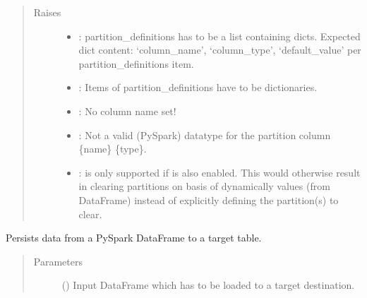 \documentclass[a4paper,10pt, twoside,english]{sphinxmanual}
\begin{document}
\begin{fulllineitems}
\begin{quote}
\begin{description}
\begin{itemize}
\end{itemize}

\item[{Raises}] \leavevmode\begin{itemize}
\item {} 
: \textendash{} partition\_definitions has to be a list containing dicts. Expected dict content:
‘column\_name’, ‘column\_type’, ‘default\_value’ per partition\_definitions item.

\item {} 
: \textendash{} Items of partition\_definitions have to be dictionaries.

\item {} 
: \textendash{} No column name set!

\item {} 
: \textendash{} Not a valid (PySpark) datatype for the partition column \{name\} \textbar{} \{type\}.

\item {} 
: \textendash{}  is only supported if  is also enabled.
This would otherwise result in clearing partitions on basis of dynamically values
(from DataFrame) instead of explicitly defining the partition(s) to clear.

\end{itemize}

\end{description}\end{quote}

\begin{fulllineitems}
\label{\detokenize{loader/hive_loader:spooq2.loader.hive_loader.HiveLoader.load}}
Persists data from a PySpark DataFrame to a target table.
\begin{quote}\begin{description}
\item[{Parameters}] \leavevmode
{} () \textendash{} Input DataFrame which has to be loaded to a target destination.


\end{description}
\end{quote}
\end{fulllineitems}
\end{fulllineitems}
\end{document}
